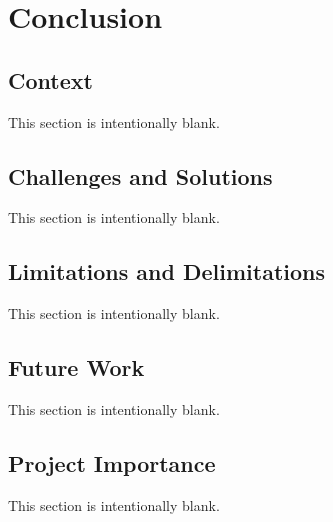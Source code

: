 \chapter{Conclusion}


\section{Context}

This section is intentionally blank.



\section{Challenges and Solutions}

This section is intentionally blank.



\section{Limitations and Delimitations}

This section is intentionally blank.



\section{Future Work}

This section is intentionally blank.


\section{Project Importance}

This section is intentionally blank.

